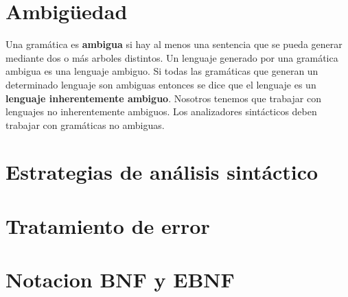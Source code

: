 \section{Ambigüedad}
Una gramática es \textbf{ambigua} si hay al menos una sentencia que se pueda generar mediante dos o más arboles distintos.
\newline
\newline
Un lenguaje generado por una gramática ambigua es una lenguaje ambiguo.
\newline
\newline
Si todas las gramáticas que generan un determinado lenguaje son ambiguas entonces se dice que el lenguaje es un \textbf{lenguaje inherentemente ambiguo}. 
\newline
\newline 
Nosotros tenemos que trabajar con lenguajes no inherentemente ambiguos.
\newline
\newline
Los analizadores sintácticos deben trabajar con gramáticas no ambiguas.
\section{Estrategias de análisis sintáctico}
\section{Tratamiento de error}
\section{Notacion BNF y EBNF}


